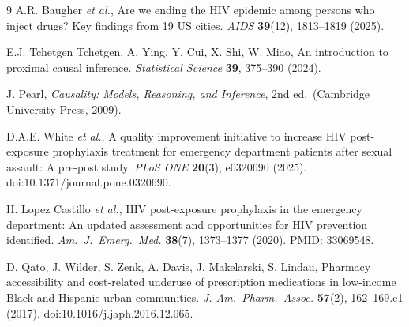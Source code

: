 \documentclass[11pt]{article}
\theoremstyle{definition}
\theoremstyle{remark}
\begin{document}
\begin{thebibliography}{9}
A.R. Baugher \textit{et al.}, Are we ending the HIV epidemic among persons who inject drugs? Key findings from 19 US cities. \textit{AIDS} \textbf{39}(12), 1813--1819 (2025).

E.J. Tchetgen Tchetgen, A. Ying, Y. Cui, X. Shi, W. Miao, An introduction to proximal causal inference. \textit{Statistical Science} \textbf{39}, 375--390 (2024).

J. Pearl, \textit{Causality: Models, Reasoning, and Inference}, 2nd ed.\ (Cambridge University Press, 2009).

D.A.E. White \textit{et al.}, A quality improvement initiative to increase HIV post-exposure prophylaxis treatment for emergency department patients after sexual assault: A pre-post study. \textit{PLoS ONE} \textbf{20}(3), e0320690 (2025). doi:10.1371/journal.pone.0320690.

H. Lopez Castillo \textit{et al.}, HIV post-exposure prophylaxis in the emergency department: An updated assessment and opportunities for HIV prevention identified. \textit{Am.\ J.\ Emerg.\ Med.} \textbf{38}(7), 1373--1377 (2020). PMID: 33069548.

D. Qato, J. Wilder, S. Zenk, A. Davis, J. Makelarski, S. Lindau, Pharmacy accessibility and cost-related underuse of prescription medications in low-income Black and Hispanic urban communities. \textit{J. Am.\ Pharm.\ Assoc.} \textbf{57}(2), 162--169.e1 (2017). doi:10.1016/j.japh.2016.12.065.
\end{thebibliography}
\end{document}
